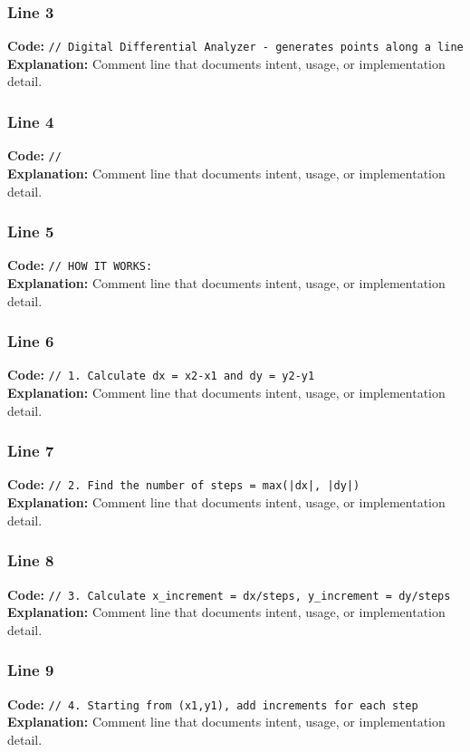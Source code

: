 \documentclass[11pt,a4paper]{article}
\begin{document}
\subsubsection*{Line 3}
\textbf{Code:} \verb|// Digital Differential Analyzer - generates points along a line|\\
\textbf{Explanation:} Comment line that documents intent, usage, or implementation detail.

\subsubsection*{Line 4}
\textbf{Code:} \verb|// |\\
\textbf{Explanation:} Comment line that documents intent, usage, or implementation detail.

\subsubsection*{Line 5}
\textbf{Code:} \verb|// HOW IT WORKS:|\\
\textbf{Explanation:} Comment line that documents intent, usage, or implementation detail.

\subsubsection*{Line 6}
\textbf{Code:} \verb|// 1. Calculate dx = x2-x1 and dy = y2-y1|\\
\textbf{Explanation:} Comment line that documents intent, usage, or implementation detail.

\subsubsection*{Line 7}
\textbf{Code:} \verb!// 2. Find the number of steps = max(|dx|, |dy|)!\\
\textbf{Explanation:} Comment line that documents intent, usage, or implementation detail.

\subsubsection*{Line 8}
\textbf{Code:} \verb|// 3. Calculate x_increment = dx/steps, y_increment = dy/steps|\\
\textbf{Explanation:} Comment line that documents intent, usage, or implementation detail.

\subsubsection*{Line 9}
\textbf{Code:} \verb|// 4. Starting from (x1,y1), add increments for each step|\\
\textbf{Explanation:} Comment line that documents intent, usage, or implementation detail.
\end{document}
